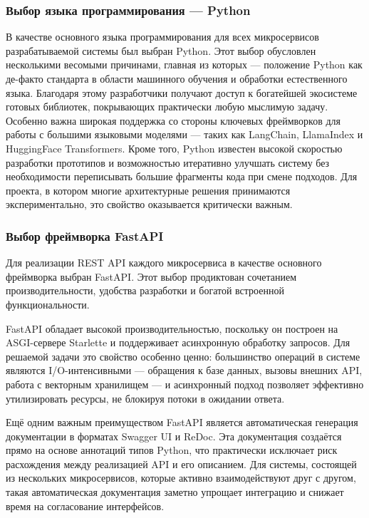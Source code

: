 \subsubsection{Выбор языка программирования — Python}

В качестве основного языка программирования для всех микросервисов разрабатываемой системы был выбран Python. Этот выбор обусловлен несколькими весомыми причинами, главная из которых — положение Python как де-факто стандарта в области машинного обучения и обработки естественного языка. Благодаря этому разработчики получают доступ к богатейшей экосистеме готовых библиотек, покрывающих практически любую мыслимую задачу. Особенно важна широкая поддержка со стороны ключевых фреймворков для работы с большими языковыми моделями — таких как LangChain, LlamaIndex и HuggingFace Transformers. Кроме того, Python известен высокой скоростью разработки прототипов и возможностью итеративно улучшать систему без необходимости переписывать большие фрагменты кода при смене подходов. Для проекта, в котором многие архитектурные решения принимаются экспериментально, это свойство оказывается критически важным.

\subsubsection{Выбор фреймворка FastAPI}

Для реализации REST API каждого микросервиса в качестве основного фреймворка выбран FastAPI. Этот выбор продиктован сочетанием производительности, удобства разработки и богатой встроенной функциональности.

FastAPI обладает высокой производительностью, поскольку он построен на ASGI-сервере Starlette и поддерживает асинхронную обработку запросов. Для решаемой задачи это свойство особенно ценно: большинство операций в системе являются I/O-интенсивными — обращения к базе данных, вызовы внешних API, работа с векторным хранилищем — и асинхронный подход позволяет эффективно утилизировать ресурсы, не блокируя потоки в ожидании ответа.

Ещё одним важным преимуществом FastAPI является автоматическая генерация документации в форматах Swagger UI и ReDoc. Эта документация создаётся прямо на основе аннотаций типов Python, что практически исключает риск расхождения между реализацией API и его описанием. Для системы, состоящей из нескольких микросервисов, которые активно взаимодействуют друг с другом, такая автоматическая документация заметно упрощает интеграцию и снижает время на согласование интерфейсов.

